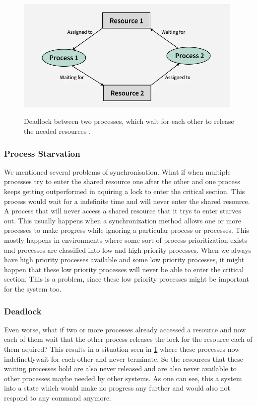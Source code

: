 \begin{figure}[!ht]
   \centering
   \captionsetup{justification=centering}
   \caption{Deadlock between two processes, which wait for each other to release the needed resources \cite{Deadlock}.}
   \includegraphics[width=110mm]{images/deadlock.png}
   \label{fig:deadlock}
\end{figure}

\subsubsection{Process Starvation}\label{subsubsec:process-starvation}

We mentioned several problems of synchronisation. What if when multiple processes try to enter the shared resource one after the other and one process keeps getting outperformed in aquiring a lock to enter the critical section. This process would wait for a indefinite time and will never enter the shared resource. A process that will never access a shared resource that it trys to enter starves out. This usually happens when a synchronization method allows one or more processes to make progress while ignoring a particular process or processes. This mostly happens in environments where some sort of process prioritization exists and processes are classified into low and high priority processes. When we always have high priority processes available and some low priority processes, it might happen that these low priority processes will never be able to enter the critical section. This is a problem, since these low priority processes might be important for the system too. \cite{Starvation}

\subsubsection{Deadlock}\label{subsubsec:deadlock}

Even worse, what if two or more processes already accessed a resource and now each of them wait that the other process releases the lock for the resource each of them aquired? This results in a situation  seen in \cref{fig:deadlock} where these processes now indefinetlywait for each other and never terminate. So the resources that these waiting processes hold are also never released and are also never available to other processes maybe needed by other systems. As one can see, this a system into a state which would make no progress any further and would also not respond to any command anymore. \cite{Deadlock,chahar2013deadlock}

